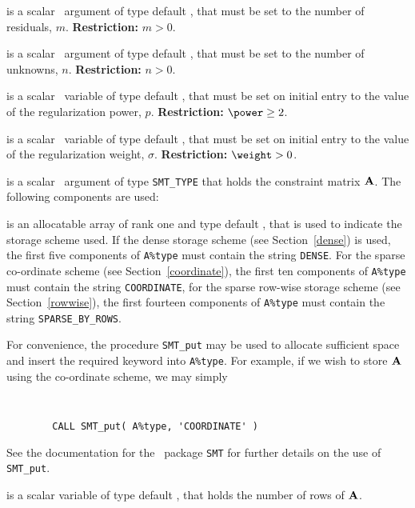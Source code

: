 \documentclass{galahad}
\begin{document}
\begin{description}

 is a scalar \intentin\ argument of type default \integer, that must be
set to the number of residuals, $m$. {\bf Restriction: } $m  >  0$.

 is a scalar \intentin\ argument of type default \integer, that must be
set to the number of unknowns, $n$. {\bf Restriction: } $n  >  0$.

 is a scalar \intentin\ variable of type default \realdp,
that must be set on initial entry
to the value of the regularization power, $p$.
{\bf Restriction: } $\power \geq 2$.

 is a scalar \intentin\ variable of type default \realdp,
that must be set on initial entry
to the value of the regularization weight, $\sigma$.
{\bf Restriction: } $\weight > 0$.

 is a scalar \intentin\ argument of type {\tt SMT\_TYPE}
that holds the constraint matrix ${\mathbf{A}}$. The following components are used:

\begin{description}

 is an allocatable array of rank one and type default
\character, that
is used to indicate the storage scheme used. If the dense storage scheme
(see Section~\ref{dense}) is used,
the first five components of {\tt A\%type} must contain the
string {\tt DENSE}.
For the sparse co-ordinate scheme (see Section~\ref{coordinate}),
the first ten components of {\tt A\%type} must contain the
string {\tt COORDINATE},
for the sparse row-wise storage scheme (see Section~\ref{rowwise}),
the first fourteen components of {\tt A\%type} must contain the
string {\tt SPARSE\_BY\_ROWS}.

For convenience, the procedure {\tt SMT\_put}
may be used to allocate sufficient space and insert the required keyword
into {\tt A\%type}.
For example, if we wish to store ${\mathbf{A}}$ using the co-ordinate scheme,
we may simply
{\tt
\begin{verbatim}
        CALL SMT_put( A%type, 'COORDINATE' )
\end{verbatim}
}
\noindent
See the documentation for the \galahad\ package {\tt SMT}
for further details on the use of {\tt SMT\_put}.

 is a scalar variable of type default \integer, that
holds the number of rows of ${\mathbf{A}}$.


\end{description}
\end{description}
\end{document}
